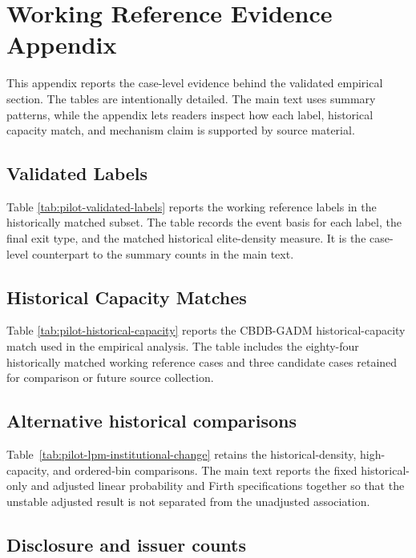 \section{Working Reference Evidence Appendix}

This appendix reports the case-level evidence behind the validated empirical
section. The tables are intentionally detailed. The main text uses summary
patterns, while the appendix lets readers inspect how each label, historical
capacity match, and mechanism claim is supported by source material.

\subsection{Validated Labels}

Table \ref{tab:pilot-validated-labels} reports the working reference labels in
the historically matched subset. The table records the event basis for
each label, the final exit type, and the matched historical elite-density
measure. It is the case-level counterpart to the summary counts in the main
text.



\subsection{Historical Capacity Matches}

Table \ref{tab:pilot-historical-capacity} reports the CBDB-GADM
historical-capacity match used in the empirical analysis. The table includes the
eighty-four historically matched working reference cases and three candidate cases retained
for comparison or future source collection.



\subsection{Alternative historical comparisons}

Table~\ref{tab:pilot-lpm-institutional-change} retains the historical-density,
high-capacity, and ordered-bin comparisons. The main text reports the fixed
historical-only and adjusted linear probability and Firth specifications
together so that the unstable adjusted result is not separated from the
unadjusted association.



\subsection{Disclosure and issuer counts}

